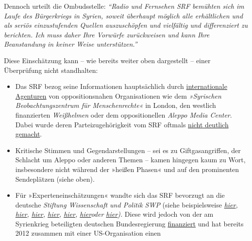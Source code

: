 Dennoch urteilt die Ombudsstelle: \emph{``Radio und Fernsehen SRF
bemühten sich im Laufe des Bürgerkriegs in Syrien, soweit überhaupt
möglich alle erhältlichen und als seriös einzustufenden Quellen
auszuschöpfen und vielfältig und differenziert zu berichten. Ich muss
daher Ihre Vorwürfe zurückweisen und kann Ihre Beanstandung in keiner
Weise unterstützen.''}

Diese Einschätzung kann -- wie bereits weiter oben dargestellt -- einer
Überprüfung nicht standhalten:

\begin{itemize}
\tightlist
\item
  Das SRF bezog seine Informationen hauptsächlich durch
  \href{https://swprs.org/der-propaganda-multiplikator/}{internationale
  Agenturen} von oppositionsnahen Organisationen wie dem
  \emph{»Syrischen Beobachtungszentrum für Menschenrechte«} in London,
  den westlich finanzierten \emph{Weißhelmen} oder dem oppositionellen
  \emph{Aleppo Media Center}. Dabei wurde deren Parteizugehörigkeit vom
  SRF oftmals \href{https://swprs.org/srf-propaganda-analyse/}{nicht
  deutlich gemacht}.
\item
  Kritische Stimmen und Gegendarstellungen -- sei es zu
  Giftgasangriffen, der Schlacht um Aleppo oder anderen Themen -- kamen
  hingegen kaum zu Wort, insbesondere nicht während der »heißen Phasen«
  und auf den prominenten Sendeplätzen (siehe oben).
\item
  Für »Experteneinschätzungen« wandte sich das SRF bevorzugt an die
  deutsche \emph{Stiftung Wissenschaft und Politik SWP} (siehe
  beispielsweise
  \emph{\href{http://www.srf.ch/news/international/syrien-experte-perthes-es-ist-ein-anderes-land-geworden}{hier},
  \href{https://www.srf.ch/news/international/auch-nach-aleppo-ist-der-krieg-in-syrien-nicht-vorbei}{hier},
  \href{http://www.srf.ch/news/international/syrienkonferenz-der-erste-schritt-in-richtung-frieden}{hier},
  \href{http://www.srf.ch/news/international/der-zeitplan-zum-frieden-in-syrien-ist-sehr-ambitioniert}{hier},
  \href{http://www.srf.ch/news/amp/article/1536306}{hier},
  \href{http://www.srf.ch/sendungen/echo-der-zeit/uno-stoppt-hilfsgueter-lieferungen-nach-syrien}{hier}oder
  \href{http://www.srf.ch/news/international/syrien-die-russen-haben-eine-flugverbotszone-errichtet}{hier}).}
  Diese wird jedoch von der am Syrienkrieg beteiligten deutschen
  Bundesregierung
  \href{https://spiegelkabinett-blog.blogspot.com/2014/05/stiftung-fur-wissenschaft-und-politik.html}{finanziert}
  und hat bereits 2012 zusammen mit einer US-Organisation einen

\end{itemize}

